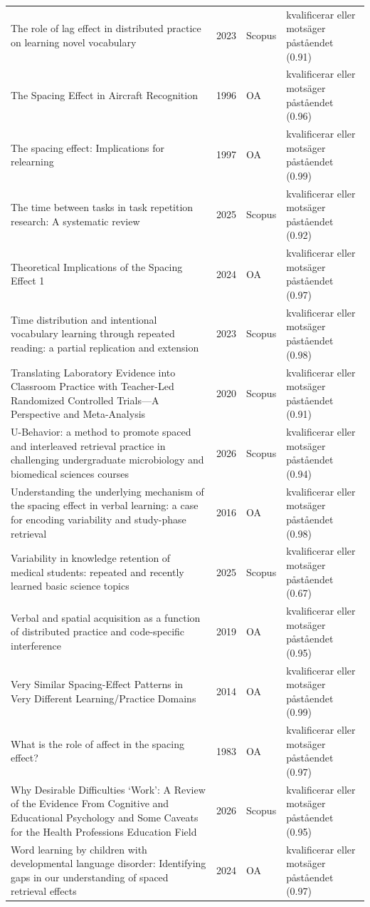 \begin{longtable}{@{}%
  >{\raggedright\arraybackslash}p{}c%
  >{\raggedright\arraybackslash}p{}%
  >{\raggedright\arraybackslash}p{}@{}}
The role of lag effect in distributed practice on learning novel vocabulary & 2023 & Scopus & kvalificerar eller motsäger påståendet (0.91) \\
The Spacing Effect in Aircraft Recognition & 1996 & OA & kvalificerar eller motsäger påståendet (0.96) \\
The spacing effect: Implications for relearning & 1997 & OA & kvalificerar eller motsäger påståendet (0.99) \\
The time between tasks in task repetition research: A systematic review & 2025 & Scopus & kvalificerar eller motsäger påståendet (0.92) \\
Theoretical Implications of the Spacing Effect 1 & 2024 & OA & kvalificerar eller motsäger påståendet (0.97) \\
Time distribution and intentional vocabulary learning through repeated reading: a partial replication and extension & 2023 & Scopus & kvalificerar eller motsäger påståendet (0.98) \\
Translating Laboratory Evidence into Classroom Practice with Teacher-Led Randomized Controlled Trials---A Perspective and Meta-Analysis & 2020 & Scopus & kvalificerar eller motsäger påståendet (0.91) \\
U-Behavior: a method to promote spaced and interleaved retrieval practice in challenging undergraduate microbiology and biomedical sciences courses & 2026 & Scopus & kvalificerar eller motsäger påståendet (0.94) \\
Understanding the underlying mechanism of the spacing effect in verbal learning: a case for encoding variability and study-phase retrieval & 2016 & OA & kvalificerar eller motsäger påståendet (0.98) \\
Variability in knowledge retention of medical students: repeated and recently learned basic science topics & 2025 & Scopus & kvalificerar eller motsäger påståendet (0.67) \\
Verbal and spatial acquisition as a function of distributed practice and code-specific interference & 2019 & OA & kvalificerar eller motsäger påståendet (0.95) \\
Very Similar Spacing-Effect Patterns in Very Different Learning/Practice Domains & 2014 & OA & kvalificerar eller motsäger påståendet (0.99) \\
What is the role of affect in the spacing effect? & 1983 & OA & kvalificerar eller motsäger påståendet (0.97) \\
Why Desirable Difficulties `Work': A Review of the Evidence From Cognitive and Educational Psychology and Some Caveats for the Health Professions Education Field & 2026 & Scopus & kvalificerar eller motsäger påståendet (0.95) \\
Word learning by children with developmental language disorder: Identifying gaps in our understanding of spaced retrieval effects & 2024 & OA & kvalificerar eller motsäger påståendet (0.97) \\
\end{longtable}
\endgroup
